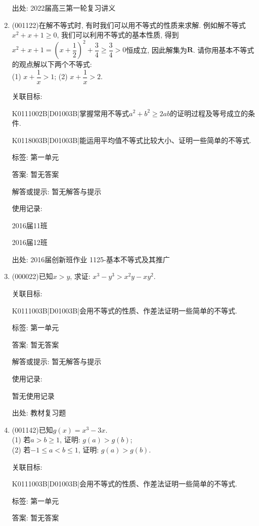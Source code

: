 \documentclass[10pt,a4paper]{article}
\begin{document}
\begin{enumerate}[1.]
出处: 2022届高三第一轮复习讲义
\item { (001122)}在解不等式时, 有时我们可以用不等式的性质来求解. 例如解不等式$x^2+x+1\ge 0$, 我们可以利用不等式的基本性质, 得到$x^2+x+1=\left(x+\dfrac{1}{2}\right)^2+\dfrac{3}{4}\ge\dfrac{3}{4}>0$恒成立, 因此解集为$\mathbf{R}$. 请你用基本不等式的观点解以下两个不等式:\\ 
(1) $x+\dfrac{1}{x}>1$; \hfill (2) $x+\dfrac{1}{x}>2$. \hfill


关联目标:

K0111002B|D01003B|掌握常用不等式$a^2+b^2 \ge 2ab$的证明过程及等号成立的条件.

K0118003B|D01003B|能运用平均值不等式比较大小、证明一些简单的不等式.



标签: 第一单元

答案: 暂无答案

解答或提示: 暂无解答与提示

使用记录:

2016届11班		

2016届12班		


出处: 2016届创新班作业	1125-基本不等式及其推广
\item { (000022)}已知$x>y$, 求证: $x^3-y^3>x^2y-xy^2$.


关联目标:

K0111003B|D01003B|会用不等式的性质、作差法证明一些简单的不等式.



标签: 第一单元

答案: 暂无答案

解答或提示: 暂无解答与提示

使用记录:

暂无使用记录


出处: 教材复习题
\item { (001142)}已知$g(x)=x^3-3x$.\\ 
(1) 若$a>b\ge 1$, 证明: $g(a)>g(b)$;\\ 
(2) 若$-1\le a<b\le 1$, 证明: $g(a)>g(b)$.


关联目标:

K0111003B|D01003B|会用不等式的性质、作差法证明一些简单的不等式.



标签: 第一单元

答案: 暂无答案


\end{enumerate}
\end{document}
